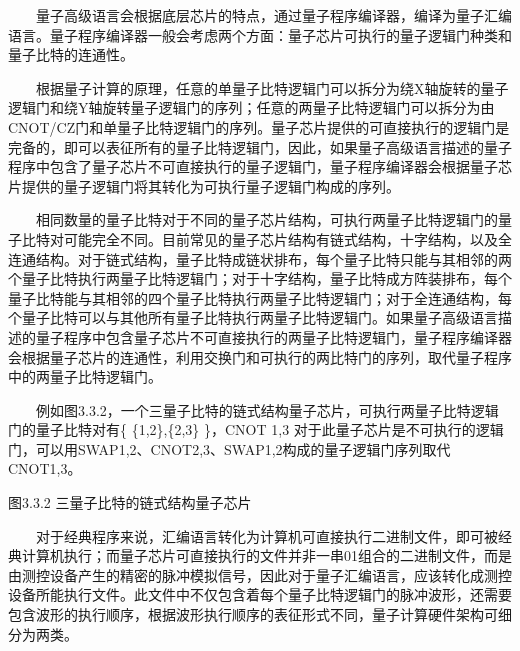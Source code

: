 \documentclass[a4paper,11pt,english]{sphinxmanual}
\begin{document}
\sphinxAtStartPar
{}

\sphinxAtStartPar
  量子高级语言会根据底层芯片的特点，通过量子程序编译器，编译为量子汇编语言。量子程序编译器一般会考虑两个方面：量子芯片可执行的量子逻辑门种类和量子比特的连通性。

\sphinxAtStartPar
{}

\sphinxAtStartPar
  根据量子计算的原理，任意的单量子比特逻辑门可以拆分为绕X轴旋转的量子逻辑门和绕Y轴旋转量子逻辑门的序列；任意的两量子比特逻辑门可以拆分为由CNOT/CZ门和单量子比特逻辑门的序列。量子芯片提供的可直接执行的逻辑门是完备的，即可以表征所有的量子比特逻辑门，因此，如果量子高级语言描述的量子程序中包含了量子芯片不可直接执行的量子逻辑门，量子程序编译器会根据量子芯片提供的量子逻辑门将其转化为可执行量子逻辑门构成的序列。

\sphinxAtStartPar
{}

\sphinxAtStartPar
  相同数量的量子比特对于不同的量子芯片结构，可执行两量子比特逻辑门的量子比特对可能完全不同。目前常见的量子芯片结构有链式结构，十字结构，以及全连通结构。对于链式结构，量子比特成链状排布，每个量子比特只能与其相邻的两个量子比特执行两量子比特逻辑门；对于十字结构，量子比特成方阵装排布，每个量子比特能与其相邻的四个量子比特执行两量子比特逻辑门；对于全连通结构，每个量子比特可以与其他所有量子比特执行两量子比特逻辑门。如果量子高级语言描述的量子程序中包含量子芯片不可直接执行的两量子比特逻辑门，量子程序编译器会根据量子芯片的连通性，利用交换门和可执行的两比特门的序列，取代量子程序中的两量子比特逻辑门。

\sphinxAtStartPar
  例如图3.3.2，一个三量子比特的链式结构量子芯片，可执行两量子比特逻辑门的量子比特对有\{ \{1,2\},\{2,3\} \}，CNOT 1,3 对于此量子芯片是不可执行的逻辑门，可以用SWAP1,2、CNOT2,3、SWAP1,2构成的量子逻辑门序列取代CNOT1,3。


\begin{center}图3.3.2 三量子比特的链式结构量子芯片
\end{center}
\sphinxAtStartPar
{}

\sphinxAtStartPar
  对于经典程序来说，汇编语言转化为计算机可直接执行二进制文件，即可被经典计算机执行；而量子芯片可直接执行的文件并非一串01组合的二进制文件，而是由测控设备产生的精密的脉冲模拟信号，因此对于量子汇编语言，应该转化成测控设备所能执行文件。此文件中不仅包含着每个量子比特逻辑门的脉冲波形，还需要包含波形的执行顺序，根据波形执行顺序的表征形式不同，量子计算硬件架构可细分为两类。
\end{document}
